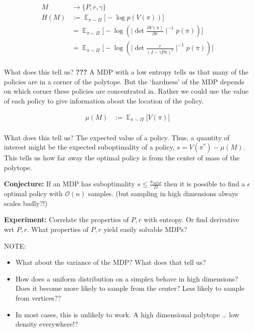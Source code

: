 \begin{align}
M &\to \{P, r, \gamma\} \tag{a MDP}\\
H(M) &:= \mathop{\mathbb E}_{\pi\sim\Pi}\Big[-\log p(V(\pi)) \Big]\\
&= \mathop{\mathbb E}_{\pi\sim\Pi}\Big[-\log(\mid \det\frac{\partial V(\pi)}{\partial \pi}\mid^{-1}p(\pi)) \Big] \\
&= \mathop{\mathbb E}_{\pi\sim\Pi}\Big[-\log(\mid \det \frac{r}{(I-\gamma P \pi)^2}\mid^{-1}p(\pi)) \Big] \\
\end{align}

What does this tell us? \textbf{???} A MDP with a low entropy tells us
that many of the policies are in a corner of the polytope. But the
`hardness' of the MDP depends on which corner these policies are
concentrated in. Rather we could use the value of each policy to give
information about the location of the policy.

\begin{align*}
\mu(M) &:= \mathop{\mathbb E}_{\pi\sim\Pi}\Big[V(\pi) \Big]\\
\end{align*}

What does this tell us? The expected value of a policy. Thus, a quantity
of interest might be the expected suboptimality of a policy,
\(s = V(\pi^{* })-\mu(M)\). This tells us how far away the optimal
policy is from the center of mass of the polytope.

\textbf{Conjecture:} If an MDP has suboptimality
\(s \le \frac{\sigma_{MDP}}{D}\) then it is possible to find a
\(\epsilon\) optimal policy with \(\mathcal O(n)\) samples. (but
sampling in high dimensions always scales badly?!)

\textbf{Experiment:} Correlate the properties of \(P, r\) with entropy.
Or find derivative wrt \(P, r\). What properties of \(P, r\) yield
easily solvable MDPs?

NOTE:

\begin{itemize}
\item
  What about the variance of the MDP? What does that tell us?
\item
  How does a uniform distribution on a simplex behave in high
  dimensions? Does it become more likely to sample from the center? Less
  likely to sample from vertices??
\item
  In most cases, this is unlikely to work. A high dimensional polytope
  \ldots{} low density everywhere!?
\end{itemize}


